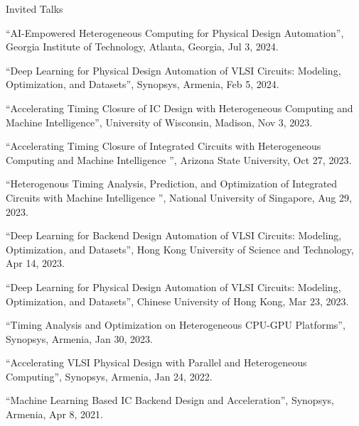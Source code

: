 \begin{rSection}{Invited Talks}
\begin{description}[font=\normalfont]
\item[{[10]}]{
``AI-Empowered Heterogeneous Computing for Physical Design Automation'', Georgia Institute of Technology, Atlanta, Georgia, Jul 3, 2024. 
}

\item[{[9]}]{
``Deep Learning for Physical Design Automation of VLSI Circuits: Modeling, Optimization, and Datasets'', Synopsys, Armenia, Feb 5, 2024. 
}

\item[{[8]}]{
``Accelerating Timing Closure of IC Design with Heterogeneous Computing and Machine Intelligence'', University of Wisconsin, Madison, Nov 3, 2023. 
}

\item[{[7]}]{
``Accelerating Timing Closure of Integrated Circuits with Heterogeneous Computing and Machine Intelligence '', Arizona State University, Oct 27, 2023. 
}

\item[{[6]}]{
``Heterogenous Timing Analysis, Prediction, and Optimization of Integrated Circuits with Machine Intelligence '', National University of Singapore, Aug 29, 2023. 
}

\item[{[5]}]{
``Deep Learning for Backend Design Automation of VLSI Circuits: Modeling, Optimization, and Datasets'', Hong Kong University of Science and Technology, Apr 14, 2023. 
}

\item[{[4]}]{
``Deep Learning for Physical Design Automation of VLSI Circuits: Modeling, Optimization, and Datasets'', Chinese University of Hong Kong, Mar 23, 2023. 
}

\item[{[3]}]{
``Timing Analysis and Optimization on Heterogeneous CPU-GPU Platforms'', Synopsys, Armenia, Jan 30, 2023. 
}

\item[{[2]}]{
``Accelerating VLSI Physical Design with Parallel and Heterogeneous Computing'', Synopsys, Armenia, Jan 24, 2022. 
}

\item[{[1]}]{
``Machine Learning Based IC Backend Design and Acceleration'', Synopsys, Armenia, Apr 8, 2021. 
}

\end{description}

\end{rSection}
